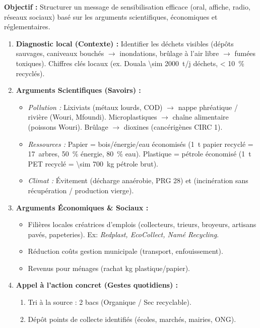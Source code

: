 \documentclass[11pt]{article}
\begin{document}
\begin{methode}
\textbf{Objectif :} Structurer un message de sensibilisation efficace (oral, affiche, radio, réseaux sociaux) basé sur les arguments scientifiques, économiques et réglementaires.
\begin{enumerate}
    \item \textbf{Diagnostic local (Contexte) :} Identifier les déchets visibles (dépôts sauvages, caniveaux bouchés $\rightarrow$ inondations, brûlage à l'air libre $\rightarrow$ fumées toxiques). Chiffres clés locaux (ex. Douala \SI{\sim 2000}{t/j} déchets, \SI{< 10}{\%} recyclés).
    \item \textbf{Arguments Scientifiques (Savoirs) :}
    \begin{itemize}
        \item \textit{Pollution :} Lixiviats (métaux lourds, COD) $\rightarrow$ nappe phréatique / rivière (Wouri, Mfoundi). Microplastiques $\rightarrow$ chaîne alimentaire (poissons Wouri). Brûlage  $\rightarrow$ dioxines (cancérigènes CIRC 1).
        \item \textit{Ressources :} Papier = bois/énergie/eau économisés (\SI{1}{t} papier recyclé = \SI{17}{arbres}, \SI{50}{\%} énergie, \SI{80}{\%} eau). Plastique = pétrole économisé (\SI{1}{t} PET recyclé = \SI{\sim 700}{kg} pétrole brut).
        \item \textit{Climat :} Évitement  (décharge anaérobie, PRG 28) et  (incinération sans récupération / production vierge).
    \end{itemize}
    \item \textbf{Arguments Économiques \& Sociaux :}
    \begin{itemize}
        \item Filières locales créatrices d'emplois (collecteurs, trieurs, broyeurs, artisans pavés, papeteries). Ex: \textit{Redplast, EcoCollect, Namé Recycling}.
        \item Réduction coûts gestion municipale (transport, enfouissement).
        \item Revenus pour ménages (rachat kg plastique/papier).
    \end{itemize}
    \item \textbf{Appel à l'action concret (Gestes quotidiens) :}
    \begin{enumerate}
        \item Tri à la source : 2 bacs (Organique / Sec recyclable).
        \item Dépôt points de collecte identifiés (écoles, marchés, mairies, ONG).

\end{enumerate}
\end{enumerate}
\end{methode}
\end{document}
